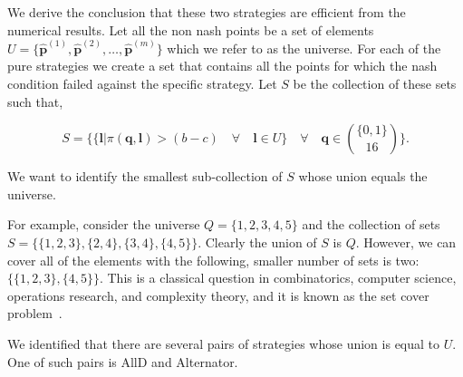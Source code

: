 \documentclass{article}
\theoremstyle{definition}
\begin{document}
We derive the conclusion that these two strategies are efficient from the
numerical results. Let all the non nash points be a set of elements \(U = \{
\mathbf{\hat{p}}^{(1)}, \mathbf{\hat{p}}^{(2)}, \dots,
\mathbf{\hat{p}}^{(m)}\}\) which we refer to as the universe. For each of the
pure strategies we create a set that contains all the points for which the
nash condition failed against the specific strategy. Let \(S\) be the
collection of these sets such that,

\begin{equation}
  S = \{\{\mathbf{l} | \pi( \mathbf{q},  \mathbf{l}) > (b - c) \quad \forall \quad \mathbf{l} \in U\} \quad \forall \quad \mathbf{q} \in
  \binom{\{0, 1\}}{16}\}.
\end{equation}

We want to identify the smallest sub-collection of \(S\) whose union equals the
universe.

For example, consider the universe \(Q = \{1, 2, 3, 4, 5\}\) and the
collection of sets \(S = \{ \{1, 2, 3\}, \{2, 4\}, \{3, 4\}, \{4, 5\} \}\).
Clearly the union of \(S\) is \(Q\). However, we can cover all of the elements with
the following, smaller number of sets is two: \(\{ \{1, 2, 3\}, \{4, 5\} \}\).
This is a classical question in combinatorics, computer science,
operations research, and complexity theory, and it is known as the set cover
problem~\citep{beasley:EJOR:1987}.

We identified that there are several pairs of strategies whose union is
equal to \(U\). One of such pairs is AllD and Alternator.
\end{document}
